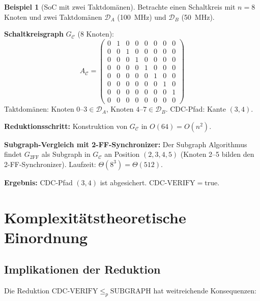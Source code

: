 ﻿\documentclass[a4paper,12pt]{article}
\theoremstyle{definition}
\newtheorem{beispiel}{Beispiel}
\begin{document}
	\begin{beispiel}[SoC mit zwei Taktdom\"anen]
		Betrachte einen Schaltkreis mit $n = 8$ Knoten und zwei Taktdom\"anen
		$\mathcal{D}_A$ (100~MHz) und $\mathcal{D}_B$ (50~MHz).
		
		\medskip
		\textbf{Schaltkreisgraph} $G_{\mathcal{C}}$ (8 Knoten):
		\[
		A_{\mathcal{C}} = \begin{pmatrix}
			0 & 1 & 0 & 0 & 0 & 0 & 0 & 0 \\
			0 & 0 & 1 & 0 & 0 & 0 & 0 & 0 \\
			0 & 0 & 0 & 1 & 0 & 0 & 0 & 0 \\
			0 & 0 & 0 & 0 & 1 & 0 & 0 & 0 \\
			0 & 0 & 0 & 0 & 0 & 1 & 0 & 0 \\
			0 & 0 & 0 & 0 & 0 & 0 & 1 & 0 \\
			0 & 0 & 0 & 0 & 0 & 0 & 0 & 1 \\
			0 & 0 & 0 & 0 & 0 & 0 & 0 & 0
		\end{pmatrix}
		\]
		Taktdom\"anen: Knoten $0$--$3 \in \mathcal{D}_A$, Knoten $4$--$7 \in \mathcal{D}_B$.
		CDC-Pfad: Kante $(3, 4)$.
		
		\medskip
		\textbf{Reduktionsschritt:} Konstruktion von $G_{\mathcal{C}}$ in $O(64) = O(n^2)$.
		
		\medskip
		\textbf{Subgraph-Vergleich mit 2-FF-Synchronizer:}
		Der Subgraph Algorithmus findet $G_{2\mathrm{FF}}$ als Subgraph in $G_{\mathcal{C}}$
		an Position $(2, 3, 4, 5)$ (Knoten 2--5 bilden den 2-FF-Synchronizer).
		Laufzeit: $\Theta(8^3) = \Theta(512)$.
		
		\medskip
		\textbf{Ergebnis:} CDC-Pfad $(3,4)$ ist abgesichert. $\mathrm{CDC\text{-}VERIFY} = \mathrm{true}$.
	\end{beispiel}
	
	\section{Komplexit\"atstheoretische Einordnung}
	
	\subsection{Implikationen der Reduktion}
	
	Die Reduktion $\mathrm{CDC\text{-}VERIFY} \leq_p \mathrm{SUBGRAPH}$ hat
	weitreichende Konsequenzen:
	
\end{document}
